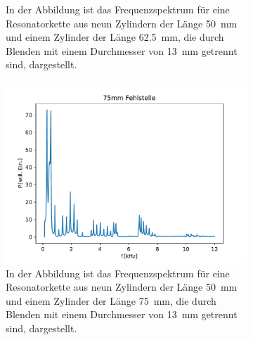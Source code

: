 \begin{figure}[ht]
\begin{subfigure}[b]{0.45\textwidth}
                    \caption{In der Abbildung ist das Frequenzspektrum für eine Resonatorkette aus neun Zylindern der Länge \SI{50}{\milli\metre} und einem Zylinder der Länge \SI{62.5}{\milli\metre}, die durch Blenden mit einem Durchmesser von \SI{13}{\milli\metre} getrennt sind, dargestellt.}
                    \label{fig:1dim_4_Zylinder_625_Fehlstelle}
                \end{subfigure}
                \centering
                \begin{subfigure}[b]{0.45\textwidth}
                    \centering
                    \includegraphics[scale=0.45]{./pictures/1dim_10_Zylinder_750_Fehlstelle.pdf}
                    \caption{In der Abbildung ist das Frequenzspektrum für eine Resonatorkette aus neun Zylindern der Länge \SI{50}{\milli\metre} und einem Zylinder der Länge \SI{75}{\milli\metre}, die durch Blenden mit einem Durchmesser von \SI{13}{\milli\metre} getrennt sind, dargestellt.}
                    \label{fig:1dim_10_Zylinder_750_Fehlstelle}
                \end{subfigure}
                \caption{ }
                \label{fig:Störstelle}
            \end{figure}
            \FloatBarrier

